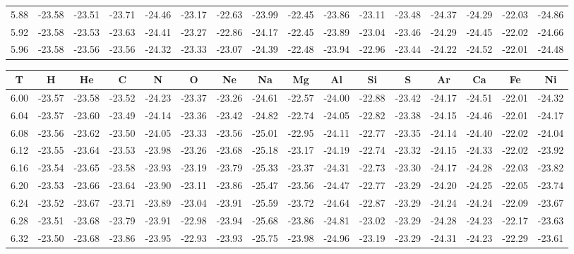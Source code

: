 \documentclass[floatfix,traditabstract,preprint2]{aa}
\begin{document}
\begin{table}
\begin{tabular}{c  c c c c c c c c c c c c c c c}
5.88 & -23.58 & -23.51 & -23.71 & -24.46 & -23.17 & -22.63 & -23.99 & -22.45 & -23.86 & -23.11 & -23.48 & -24.37 & -24.29 & -22.03 & -24.86\\
5.92 & -23.58 & -23.53 & -23.63 & -24.41 & -23.27 & -22.86 & -24.17 & -22.45 & -23.89 & -23.04 & -23.46 & -24.29 & -24.45 & -22.02 & -24.66\\
5.96 & -23.58 & -23.56 & -23.56 & -24.32 & -23.33 & -23.07 & -24.39 & -22.48 & -23.94 & -22.96 & -23.44 & -24.22 & -24.52 & -22.01 & -24.48\\

\end{tabular}
\end{table}  
\begin{table}
\centering                 
\begin{tabular}{c  c c c c c c c c c c c c c c c}       
T & H & He & C & N & O & Ne & Na & Mg & Al & Si & S & Ar & Ca & Fe & Ni\\
\hline
6.00 & -23.57 & -23.58 & -23.52 & -24.23 & -23.37 & -23.26 & -24.61 & -22.57 & -24.00 & -22.88 & -23.42 & -24.17 & -24.51 & -22.01 & -24.32\\
6.04 & -23.57 & -23.60 & -23.49 & -24.14 & -23.36 & -23.42 & -24.82 & -22.74 & -24.05 & -22.82 & -23.38 & -24.15 & -24.46 & -22.01 & -24.17\\
6.08 & -23.56 & -23.62 & -23.50 & -24.05 & -23.33 & -23.56 & -25.01 & -22.95 & -24.11 & -22.77 & -23.35 & -24.14 & -24.40 & -22.02 & -24.04\\
6.12 & -23.55 & -23.64 & -23.53 & -23.98 & -23.26 & -23.68 & -25.18 & -23.17 & -24.19 & -22.74 & -23.32 & -24.15 & -24.33 & -22.02 & -23.92\\
6.16 & -23.54 & -23.65 & -23.58 & -23.93 & -23.19 & -23.79 & -25.33 & -23.37 & -24.31 & -22.73 & -23.30 & -24.17 & -24.28 & -22.03 & -23.82\\
6.20 & -23.53 & -23.66 & -23.64 & -23.90 & -23.11 & -23.86 & -25.47 & -23.56 & -24.47 & -22.77 & -23.29 & -24.20 & -24.25 & -22.05 & -23.74\\
6.24 & -23.52 & -23.67 & -23.71 & -23.89 & -23.04 & -23.91 & -25.59 & -23.72 & -24.64 & -22.87 & -23.29 & -24.24 & -24.24 & -22.09 & -23.67\\
6.28 & -23.51 & -23.68 & -23.79 & -23.91 & -22.98 & -23.94 & -25.68 & -23.86 & -24.81 & -23.02 & -23.29 & -24.28 & -24.23 & -22.17 & -23.63\\
6.32 & -23.50 & -23.68 & -23.86 & -23.95 & -22.93 & -23.93 & -25.75 & -23.98 & -24.96 & -23.19 & -23.29 & -24.31 & -24.23 & -22.29 & -23.61\\

\end{tabular}
\end{table}
\end{document}
